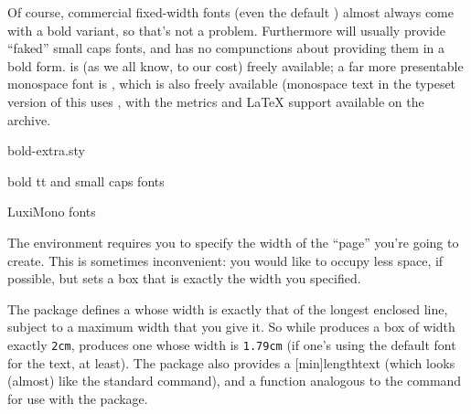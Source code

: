 Of course, commercial fixed-width fonts (even the default
) almost always come with a bold variant, so that's
not a problem.  Furthermore 
will usually provide ``faked'' small caps fonts, and has no
compunctions about providing them in a bold form.  
is (as we all know, to our cost) freely available; a far more
presentable monospace font is , which is also
freely available (monospace text in the typeset version of this
 uses , with the metrics and \LaTeX{}
support available on the archive.
\begin{ctanrefs}
\item[bold-extra.sty]
\item[bold tt and small caps fonts]
\item[\nothtml{\rmfamily}LuxiMono fonts]
\end{ctanrefs}


The  environment requires you to specify the
width of the ``page'' you're going to create.  This is sometimes
inconvenient: you would like to occupy less space, if possible, but
 sets a box that is exactly the width you
specified.

The  package defines a  whose width is exactly
that of the longest enclosed line, subject to a maximum width that you
give it.  So while  produces a
box of width exactly \texttt{2cm},
 produces one whose width is
\texttt{1.79cm} (if one's using the default  font for the
text, at least).  The package also provides a
[min]{length}{text} (which looks (almost)
like the standard  command), and a 
function analogous to the  command for use with the
 package.

